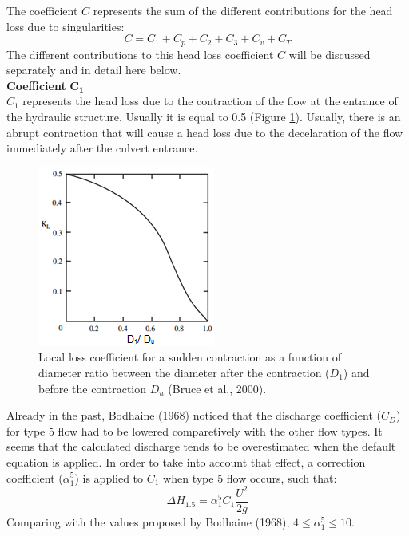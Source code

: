 The coefficient $C$ represents the sum of the different contributions for the 
head loss due to singularities:
\begin{equation}
C=C_1+C_p+C_2+C_3+C_v+C_T
\end{equation}
The different contributions to this head loss coefficient $C$ will be discussed 
separately and in detail here below.\\

\textbf{Coefficient} $\mathbf{C_1}$ \\
$C_1$ represents the head loss due to the contraction of the flow at the entrance 
of the hydraulic structure. 
Usually it is equal to 0.5 (Figure \ref{fig:culvert_fig7}). 
Usually, there is an abrupt contraction that will cause a head loss due to 
the decelaration of the flow immediately after the culvert entrance.   

\begin{figure}[H]
\begin{center}
  \includegraphics[scale=1]{culvert_fig7.png}
\end{center}
\caption{Local loss coefficient for a sudden contraction as 
a function of diameter ratio between the diameter after the contraction ($D_1$) 
and before the contraction $D_u$ (Bruce et al., 2000).}
\label{fig:culvert_fig7}
\end{figure}

Already in the past, Bodhaine (1968) noticed that the discharge coefficient ($C_D$) 
for type 5 flow had to be lowered comparetively with the other flow types. 
It seems that the calculated discharge tends to be overestimated when the 
default equation is applied. In order to take into account that effect, 
a correction coefficient ($\alpha_1^5$) is applied to $C_1$ when type 5 flow occurs, such that:
\begin{equation}
\Delta H_{1.5}=\alpha_1^5 C_1  \dfrac{U^2}{2g}
\end{equation}
Comparing with the values proposed by Bodhaine (1968), $4 \le \alpha_1^5 \le 10$.\\

